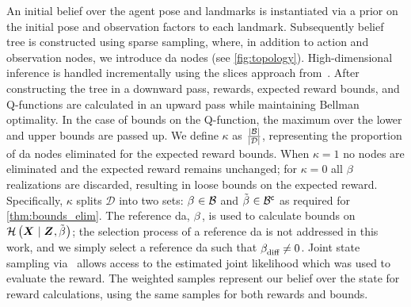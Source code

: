 An initial belief over the agent pose and landmarks is instantiated via a prior on the initial pose and observation factors to each landmark. Subsequently belief tree is constructed using sparse sampling, where, in addition to action and observation nodes, we introduce \gls{da} nodes (see \cref{fig:topology}). High-dimensional inference is handled incrementally using the slices approach from~\cite{Shienman24arxiv}. After constructing the tree in a downward pass, rewards, expected reward bounds, and Q-functions are calculated in an upward pass while maintaining Bellman optimality. In the case of bounds on the Q-function, the maximum over the lower and upper bounds are passed up. We define $\kappa$ as $\frac{\lvert\mathcal B\rvert}{\lvert\mathcal{D}\rvert}$, representing the proportion of \gls{da} nodes eliminated for the expected reward bounds.  When $\kappa=1$ no nodes are eliminated and the expected reward remains unchanged; for $\kappa=0$ all $\beta_{}^{}$ realizations are discarded, resulting in loose bounds on the expected reward. Specifically, $\kappa$ splits $\mathcal{D}$ into two sets: $\beta_{}^{}\in\mathcal B$ and $\tilde{\beta_{}^{}}\in{\ensuremath{\mathcal B}}^{\mathsf{c}}$ as required for \autoref{thm:bounds_elim}. The reference \gls{da}, $\beta_{}^{}$, is used to calculate bounds on $\mathcal{H}\left({\boldsymbol X_{}}\mid{\ensuremath{\boldsymbol Z_{}},\tilde{\ensuremath{\beta_{}^{}}}}\right)$; the selection process of a reference \gls{da} is not addressed in this work, and we simply select a reference \gls{da} such that $\beta_{\textup{diff}}^{}\neq0$. Joint state sampling via~\cite{Shienman24arxiv} allows access to the estimated joint likelihood which was used to evaluate the reward. The weighted samples represent our belief over the state for reward calculations, using the same samples for both rewards and bounds.

